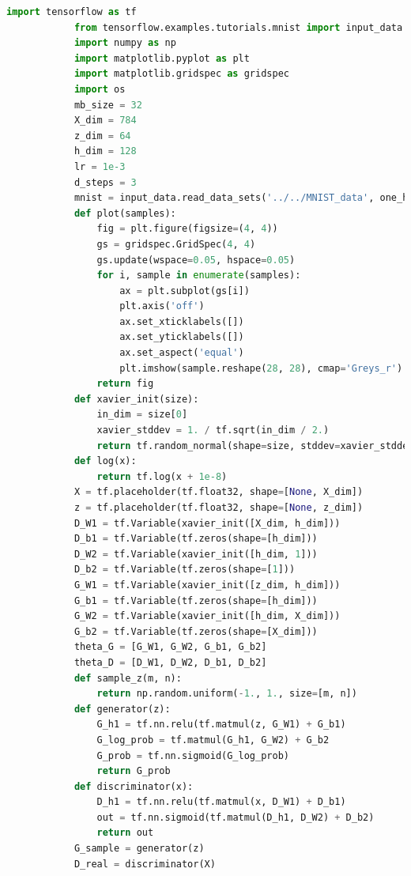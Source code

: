             \begin{lstlisting}[language = Python]
            import tensorflow as tf
            from tensorflow.examples.tutorials.mnist import input_data
            import numpy as np
            import matplotlib.pyplot as plt
            import matplotlib.gridspec as gridspec
            import os
            mb_size = 32
            X_dim = 784
            z_dim = 64
            h_dim = 128
            lr = 1e-3
            d_steps = 3
            mnist = input_data.read_data_sets('../../MNIST_data', one_hot=True)
            def plot(samples):
                fig = plt.figure(figsize=(4, 4))
                gs = gridspec.GridSpec(4, 4)
                gs.update(wspace=0.05, hspace=0.05)
                for i, sample in enumerate(samples):
                    ax = plt.subplot(gs[i])
                    plt.axis('off')
                    ax.set_xticklabels([])
                    ax.set_yticklabels([])
                    ax.set_aspect('equal')
                    plt.imshow(sample.reshape(28, 28), cmap='Greys_r')
                return fig
            def xavier_init(size):
                in_dim = size[0]
                xavier_stddev = 1. / tf.sqrt(in_dim / 2.)
                return tf.random_normal(shape=size, stddev=xavier_stddev)
            def log(x):
                return tf.log(x + 1e-8)
            X = tf.placeholder(tf.float32, shape=[None, X_dim])
            z = tf.placeholder(tf.float32, shape=[None, z_dim])
            D_W1 = tf.Variable(xavier_init([X_dim, h_dim]))
            D_b1 = tf.Variable(tf.zeros(shape=[h_dim]))
            D_W2 = tf.Variable(xavier_init([h_dim, 1]))
            D_b2 = tf.Variable(tf.zeros(shape=[1]))
            G_W1 = tf.Variable(xavier_init([z_dim, h_dim]))
            G_b1 = tf.Variable(tf.zeros(shape=[h_dim]))
            G_W2 = tf.Variable(xavier_init([h_dim, X_dim]))
            G_b2 = tf.Variable(tf.zeros(shape=[X_dim]))
            theta_G = [G_W1, G_W2, G_b1, G_b2]
            theta_D = [D_W1, D_W2, D_b1, D_b2]
            def sample_z(m, n):
                return np.random.uniform(-1., 1., size=[m, n])
            def generator(z):
                G_h1 = tf.nn.relu(tf.matmul(z, G_W1) + G_b1)
                G_log_prob = tf.matmul(G_h1, G_W2) + G_b2
                G_prob = tf.nn.sigmoid(G_log_prob)
                return G_prob
            def discriminator(x):
                D_h1 = tf.nn.relu(tf.matmul(x, D_W1) + D_b1)
                out = tf.nn.sigmoid(tf.matmul(D_h1, D_W2) + D_b2)
                return out
            G_sample = generator(z)
            D_real = discriminator(X)

\end{lstlisting}
